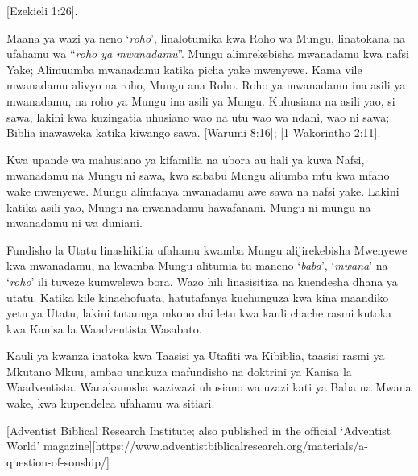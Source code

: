 [Ezekieli 1:26].


Maana ya wazi ya neno ‘\textit{roho}’, linalotumika kwa Roho wa Mungu, linatokana na ufahamu wa “\textit{roho ya mwanadamu}”. Mungu alimrekebisha mwanadamu kwa nafsi Yake; Alimuumba mwanadamu katika picha yake mwenyewe. Kama vile mwanadamu alivyo na roho, Mungu ana Roho. Roho ya mwanadamu ina asili ya mwanadamu, na roho ya Mungu ina asili ya Mungu. Kuhusiana na asili yao, si sawa, lakini kwa kuzingatia uhusiano wao na utu wao wa ndani, wao ni sawa; Biblia inawaweka katika kiwango sawa. [Warumi 8:16]; [1 Wakorintho 2:11].


Kwa upande wa mahusiano ya kifamilia na ubora au hali ya kuwa Nafsi, mwanadamu na Mungu ni sawa, kwa sababu Mungu aliumba mtu kwa mfano wake mwenyewe. Mungu alimfanya mwanadamu awe sawa na nafsi yake. Lakini katika asili yao, Mungu na mwanadamu hawafanani. Mungu ni mungu na mwanadamu ni wa duniani.


Fundisho la Utatu linashikilia ufahamu kwamba Mungu alijirekebisha Mwenyewe kwa mwanadamu, na kwamba Mungu alitumia tu maneno ‘\textit{baba}’, ‘\textit{mwana}’ na ‘\textit{roho}’ ili tuweze kumwelewa bora. Wazo hili linasisitiza na kuendesha dhana ya utatu. Katika kile kinachofuata, hatutafanya kuchunguza kwa kina maandiko yetu ya Utatu, lakini tutaunga mkono dai letu kwa kauli chache rasmi kutoka kwa Kanisa la Waadventista Wasabato.


Kauli ya kwanza inatoka kwa Taasisi ya Utafiti wa Kibiblia, taasisi rasmi ya Mkutano Mkuu, ambao unakuza mafundisho na doktrini ya Kanisa la Waadventista. Wanakanusha waziwazi uhusiano wa uzazi kati ya Baba na Mwana wake, kwa kupendelea ufahamu wa sitiari.


[Adventist Biblical Research Institute; also published in the official ‘Adventist World’ magazine][https://www.adventistbiblicalresearch.org/materials/a-question-of-sonship/]


